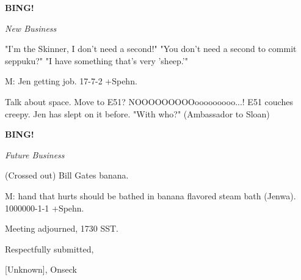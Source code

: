 \documentclass[12pt]{article}
\newcommand{\bing}{{\bf BING!} }
\newcommand{\goto}[1]{\bing \vskip 12pt \centerline{{\em{#1}}}}
\begin{document}
\goto{New Business}

"I'm the Skinner, I don't need a second!" "You don't need a second to commit seppuku?" "I have something that's very 'sheep.'"

M: Jen getting job. 17-7-2 +Spehn.

Talk about space. Move to E51? NOOOOOOOOOooooooooo...! E51 couches creepy. Jen has slept on it before. "With who?" (Ambassador to Sloan)

\goto{Future Business}

(Crossed out) Bill Gates banana.

M: hand that hurts should be bathed in banana flavored steam bath (Jenwa). 1000000-1-1 +Spehn.

\vspace{12pt}

\noindent
Meeting adjourned, 1730 SST.

\vspace{18pt}

\centerline{Respectfully submitted,}
\centerline{[Unknown], Onseck}
\end{document}
